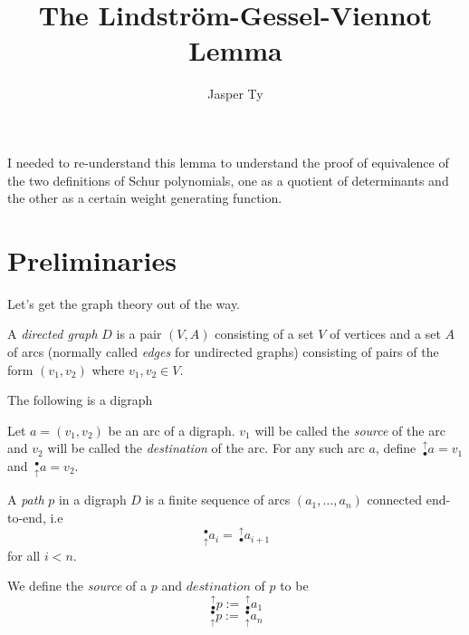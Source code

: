 \documentclass{article}
\title{The Lindstr\"om-Gessel-Viennot Lemma}
\author{Jasper Ty}
\date{}
\newcommand\astart{\mathrel{~_\bullet^\uparrow}}
\newcommand\aend{\mathrel{~_\uparrow^\bullet}}
\begin{document}
\maketitle

I needed to re-understand this lemma to understand the proof of equivalence of the two definitions of Schur polynomials, one as a quotient of determinants and the other as a certain weight generating function.

\section{Preliminaries}

Let's get the graph theory out of the way.

\begin{definition}[Digraphs]
    A \textit{directed graph} $D$ is a pair $(V, A)$ consisting of a set $V$ of vertices and a set $A$ of arcs (normally called \textit{edges} for undirected graphs) consisting of pairs of the form $(v_1, v_2)$ where $v_1, v_2 \in V$. 
\end{definition}

\begin{example}
    The following is a digraph

\end{example}

\begin{definition}[Arcs]
    Let $a = (v_1, v_2)$ be an arc of a digraph.
    $v_1$ will be called the \textit{source} of the arc and $v_2$ will be called the \textit{destination} of the arc. For any such arc $a$, define $\astart a = v_1$ and $\aend a = v_2$.
\end{definition}

\begin{definition}[Paths]
    A \textit{path} $p$ in a digraph $D$ is a finite sequence of arcs $(a_1,\ldots,a_n)$ connected end-to-end, i.e 
    \[
        \aend a_i = \astart a_{i+1}
    \]
    for all $i < n$.

    We define the \textit{source} of a $p$ and $\textit{destination}$ of $p$ to be
    \[
        \astart p := \astart a_1
    \]
    \[
        \aend p := \aend a_n
    \]
\end{definition}
\end{document}
